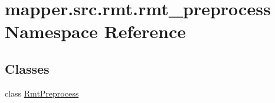 \hypertarget{namespacemapper_1_1src_1_1rmt_1_1rmt__preprocess}{}\section{mapper.\+src.\+rmt.\+rmt\+\_\+preprocess Namespace Reference}
\label{namespacemapper_1_1src_1_1rmt_1_1rmt__preprocess}
\subsection*{Classes}
\begin{DoxyCompactItemize}
\item 
class \hyperlink{classmapper_1_1src_1_1rmt_1_1rmt__preprocess_1_1_rmt_preprocess}{Rmt\+Preprocess}
\end{DoxyCompactItemize}
